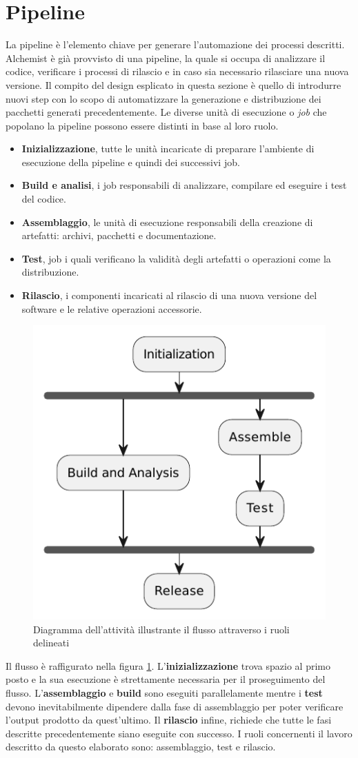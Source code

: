 \section{Pipeline}
La pipeline è l'elemento chiave per generare l'automazione dei processi descritti. Alchemist è già provvisto di una pipeline, la quale si occupa di analizzare il codice, verificare i processi di rilascio e in caso sia necessario rilasciare una nuova versione. Il compito del design esplicato in questa sezione è quello di introdurre nuovi step con lo scopo di automatizzare la generazione e distribuzione dei pacchetti generati precedentemente. Le diverse unità di esecuzione o \textit{job} che popolano la pipeline possono essere distinti in base al loro ruolo.
\begin{itemize}
	\item \textbf{Inizializzazione}, tutte le unità incaricate di preparare l'ambiente di esecuzione della pipeline e quindi dei successivi job. 
	\item \textbf{Build e analisi}, i job responsabili di analizzare, compilare ed eseguire i test del codice.
	\item \textbf{Assemblaggio}, le unità di esecuzione responsabili della creazione di artefatti: archivi, pacchetti e documentazione.
	\item \textbf{Test}, job i quali verificano la validità degli artefatti o operazioni come la distribuzione.
	\item \textbf{Rilascio}, i componenti incaricati al rilascio di una nuova versione del software e le relative operazioni accessorie.
\end{itemize}
\begin{figure}[htb]
	\centering
	\includegraphics[width=.5\linewidth]{figures/pipeline-roles.pdf}
	\caption{Diagramma dell'attività illustrante il flusso attraverso i ruoli delineati}
	\label{fig:workflow-roles-summary}
\end{figure}
Il flusso è raffigurato nella figura \ref{fig:workflow-roles-summary}. L'\textbf{inizializzazione} trova spazio al primo posto e la sua esecuzione è strettamente necessaria per il proseguimento del flusso. L'\textbf{assemblaggio} e \textbf{build} sono eseguiti parallelamente mentre i \textbf{test} devono inevitabilmente dipendere dalla fase di assemblaggio per poter verificare l'output prodotto da quest'ultimo. Il \textbf{rilascio} infine, richiede che tutte le fasi descritte precedentemente siano eseguite con successo. I ruoli concernenti il lavoro descritto da questo elaborato sono: assemblaggio, test e rilascio.

